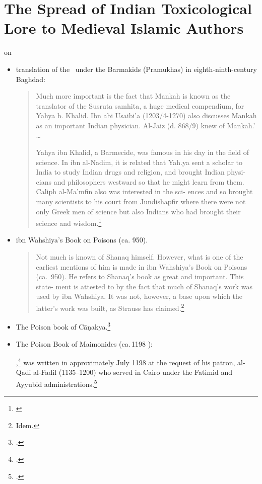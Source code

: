 \section{The Spread of Indian Toxicological Lore to Medieval Islamic 
Authors}

\citet[Introduction]{leve-1966} on 
\begin{itemize}
    \item translation of the \SS\ under the Barmakids (Pramukhas) in 
    eighth-ninth-century Baghdad:
    \begin{quote}
        Much more important is the fact
        that Mankah is known as the translator of the Susruta
        samhita, a huge medical compendium, for Yahya b.
        Khalid. Ibn abi Usaibi'a (1203/4-1270) also discusses
        Mankah as an important Indian physician. Al-Jaiz
        (d. 868/9) knew of Mankah.'
        \ldots
        
        Yahya ibn Khalid, a Barmecide, was famous in his
        day in the field of science. In ibn al-Nadim, it is
        related that Yah.ya sent a scholar to India to study
        Indian drugs and religion, and brought Indian physi-
        cians and philosophers westward so that he might learn
        from them.
        Caliph al-Ma'mfin  also was interested in the sci-
        ences and so brought many scientists to his court from
        Jundishapfir where there were not only Greek men of
        science but also Indians who had brought their science
        and wisdom.\footnote{\cite[6]{leve-1966}}
    \end{quote}
    
    \item ibn Wahshiya's Book on Poisons (ca. 950). 
    \begin{quote}
        Not much is known of Shanaq himself. However,
        what is one of the earliest mentions of him is made in
        ibn Wahshiya's Book on Poisons (ca.\ 950). He refers
        to Shanaq's book as great and important. This state-
        ment is attested to by the fact that much of Shanaq's
        work was used by ibn Wahshiya. It was not, however,
        a base upon which the latter's work was built, as
        Strauss has claimed.\footnote{Idem.}
    \end{quote}
    \item The Poison book of Cāṇakya.\footcite{stra-1934}

\item The Poison Book of Maimonides (ca.\,1198 \CE):

,\footcite{rosn-1968}  was written in
approximately July 1198 at the request of his patron, al-Qadi
al-Fadil (1135--1200) who served in Cairo under the Fatimid and
Ayyubid administrations.\footcite[31]{krae-2005}
\end{itemize}
